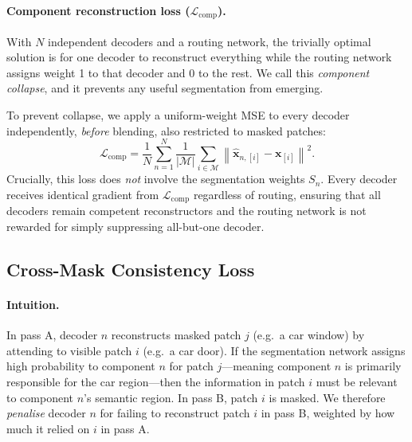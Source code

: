 \documentclass{article}
\newcommand{\bx}{\mathbf{x}}
\begin{document}
\paragraph{Component reconstruction loss ($\mathcal{L}_\mathrm{comp}$).}
With $N$ independent decoders and a routing network, the trivially optimal solution
is for one decoder to reconstruct everything while the routing network assigns weight
1 to that decoder and 0 to the rest.  We call this \emph{component collapse}, and
it prevents any useful segmentation from emerging.

To prevent collapse, we apply a uniform-weight MSE to every decoder independently,
\emph{before} blending, also restricted to masked patches:
\begin{equation}
  \mathcal{L}_\mathrm{comp} = \frac{1}{N} \sum_{n=1}^{N}
  \frac{1}{|\mathcal{M}|} \sum_{i \in \mathcal{M}}
  \left\|\hat{\bx}_{n,[i]} - \bx_{[i]}\right\|^2.
\end{equation}
Crucially, this loss does \emph{not} involve the segmentation weights $S_n$.
Every decoder receives identical gradient from $\mathcal{L}_\mathrm{comp}$
regardless of routing, ensuring that all decoders remain competent
reconstructors and the routing network is not rewarded for simply suppressing
all-but-one decoder.

\subsection{Cross-Mask Consistency Loss}
\label{sec:cmloss}

\paragraph{Intuition.}
In pass A, decoder $n$ reconstructs masked patch $j$ (e.g.\ a car window) by
attending to visible patch $i$ (e.g.\ a car door).  If the segmentation network
assigns high probability to component $n$ for patch $j$---meaning component $n$
is primarily responsible for the car region---then the information in patch $i$
must be relevant to component $n$'s semantic region.  In pass B, patch $i$ is
masked.  We therefore \emph{penalise} decoder $n$ for failing to reconstruct
patch $i$ in pass B, weighted by how much it relied on $i$ in pass A.
\end{document}
